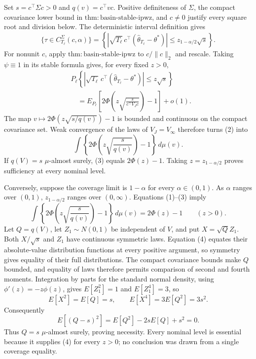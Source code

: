Set \(s=c^\top\Sigma c>0\) and \(q(v)=c^\top vc\). Positive definiteness of \(\Sigma\), the compact covariance lower bound in \(\mathrm{thm:basin\text{-}stable\text{-}ipwz}\), and \(c\ne0\) justify every square root and division below. The deterministic interval definition gives
\[
 \{\tau\in C_{T_\ell}^{\Sigma}(c,\alpha)\}
 =\left\{\left|\sqrt{T_\ell}\,c^\top(\widehat\theta_{T_\ell}-\theta^*)\right|
 \le z_{1-\alpha/2}\sqrt s\right\}.
\tag{1}
\]
For nonunit \(c\), apply \(\mathrm{thm:basin\text{-}stable\text{-}ipwz}\) to \(c/\|c\|_2\) and rescale. Taking \(\psi\equiv1\) in its stable formula gives, for every fixed \(z>0\),
\[
\begin{aligned}
 &P_\ell\!\left\{\left|\sqrt{T_\ell}\,c^\top
 (\widehat\theta_{T_\ell}-\theta^*)\right|\le z\sqrt s\right\}\\
 &\quad=E_{P_\ell}\!\left[2\Phi\!\left(z\sqrt{\frac{s}{c^\top V_Jc}}\right)-1\right]+o(1).
\end{aligned}
\tag{2}
\]
The map \(v\mapsto2\Phi(z\sqrt{s/q(v)})-1\) is bounded and continuous on the compact covariance set. Weak convergence of the laws of \(V_J=V_\infty\) therefore turns (2) into
\[
 \int\left\{2\Phi\!\left(z\sqrt{\frac{s}{q(v)}}\right)-1\right\}\,d\mu(v).
\tag{3}
\]
If \(q(V)=s\) \(\mu\)-almost surely, (3) equals \(2\Phi(z)-1\). Taking \(z=z_{1-\alpha/2}\) proves sufficiency at every nominal level.

Conversely, suppose the coverage limit is \(1-\alpha\) for every \(\alpha\in(0,1)\). As \(\alpha\) ranges over \((0,1)\), \(z_{1-\alpha/2}\) ranges over \((0,\infty)\). Equations (1)--(3) imply
\[
 \int\left\{2\Phi\!\left(z\sqrt{\frac{s}{q(v)}}\right)-1\right\}\,d\mu(v)
 =2\Phi(z)-1\qquad(z>0).
\tag{4}
\]
Let \(Q=q(V)\), let \(Z_1\sim N(0,1)\) be independent of \(V\), and put \(X=\sqrt QZ_1\). Both \(X/\sqrt s\) and \(Z_1\) have continuous symmetric laws. Equation (4) equates their absolute-value distribution functions at every positive argument, so symmetry gives equality of their full distributions. The compact covariance bounds make \(Q\) bounded, and equality of laws therefore permits comparison of second and fourth moments. Integration by parts for the standard normal density, using \(\phi'(z)=-z\phi(z)\), gives \(E[Z_1^2]=1\) and \(E[Z_1^4]=3\), so
\[
 E[X^2]=E[Q]=s,
 \qquad E[X^4]=3E[Q^2]=3s^2.
\tag{5}
\]
Consequently
\[
 E[(Q-s)^2]=E[Q^2]-2sE[Q]+s^2=0.
\tag{6}
\]
Thus \(Q=s\) \(\mu\)-almost surely, proving necessity. Every nominal level is essential because it supplies (4) for every \(z>0\); no conclusion was drawn from a single coverage equality.